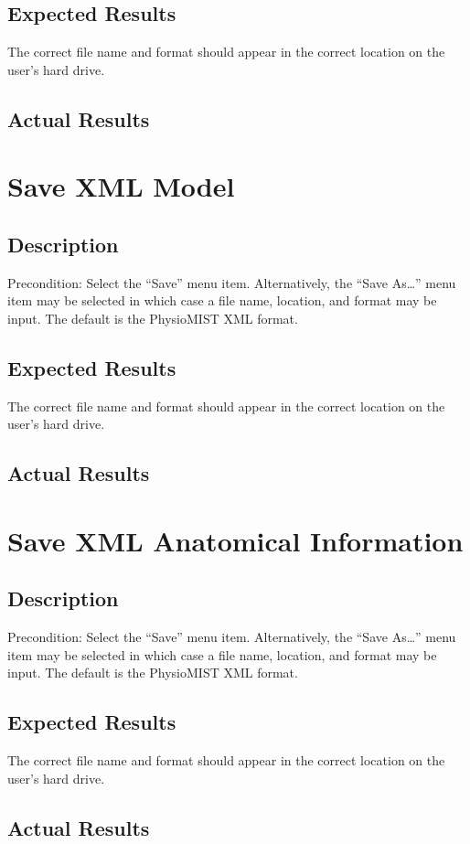 \documentclass{article}
\begin{document}
\subsection{Expected Results}
The correct file name and format should appear in the correct location on the user's hard drive.
\subsection{Actual Results}

\section{Save XML Model}
\subsection{Description}
Precondition: Select the ``Save'' menu item.  Alternatively, the ``Save As\ldots'' menu item may be selected in which case a file name, location, and format may be input.  The default is the PhysioMIST XML format.
\subsection{Expected Results}
The correct file name and format should appear in the correct location on the user's hard drive.
\subsection{Actual Results}

\section{Save XML Anatomical Information}
\subsection{Description}
Precondition: Select the ``Save'' menu item.  Alternatively, the ``Save As\ldots'' menu item may be selected in which case a file name, location, and format may be input.  The default is the PhysioMIST XML format.
\subsection{Expected Results}
The correct file name and format should appear in the correct location on the user's hard drive.
\subsection{Actual Results}
\end{document}
